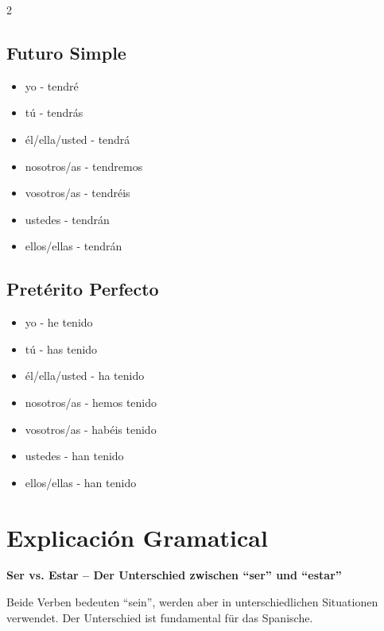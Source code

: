 \documentclass[12pt,a4paper]{article}
\begin{document}
\begin{multicols}{2}
\columnbreak

\subsection*{Futuro Simple}
\begin{itemize}[leftmargin=*]
    \item yo - tendré
    \item tú - tendrás
    \item él/ella/usted - tendrá
    \item nosotros/as - tendremos
    \item vosotros/as - tendréis
    \item ustedes - tendrán
    \item ellos/ellas - tendrán
\end{itemize}

\subsection*{Pretérito Perfecto}
\begin{itemize}[leftmargin=*]
    \item yo - he tenido
    \item tú - has tenido
    \item él/ella/usted - ha tenido
    \item nosotros/as - hemos tenido
    \item vosotros/as - habéis tenido
    \item ustedes - han tenido
    \item ellos/ellas - han tenido
\end{itemize}

\end{multicols}

\newpage

\section*{Explicación Gramatical}

\textbf{Ser vs. Estar -- Der Unterschied zwischen \enquote{ser} und \enquote{estar}}

Beide Verben bedeuten \enquote{sein}, werden aber in unterschiedlichen Situationen verwendet. Der Unterschied ist fundamental für das Spanische.
\end{document}
